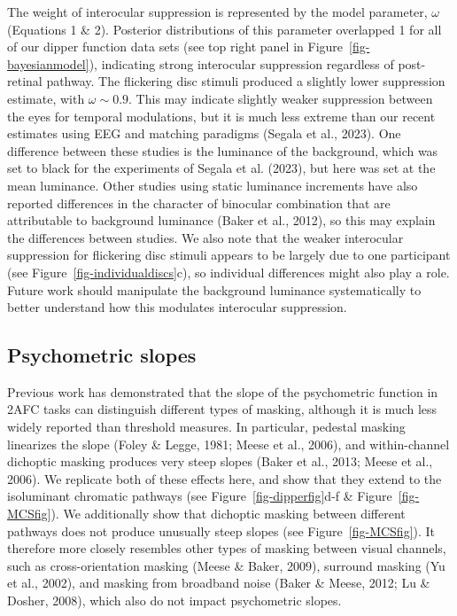 \documentclass[
  letterpaper,
  DIV=11,
  numbers=noendperiod]{scrartcl}
\begin{document}
The weight of interocular suppression is represented by the model
parameter, \(\omega\) (Equations 1 \& 2). Posterior distributions of
this parameter overlapped 1 for all of our dipper function data sets
(see top right panel in Figure~\ref{fig-bayesianmodel}), indicating
strong interocular suppression regardless of post-retinal pathway. The
flickering disc stimuli produced a slightly lower suppression estimate,
with \(\omega \sim 0.9\). This may indicate slightly weaker suppression
between the eyes for temporal modulations, but it is much less extreme
than our recent estimates using EEG and matching paradigms (Segala et
al., 2023). One difference between these studies is the luminance of the
background, which was set to black for the experiments of Segala et al.
(2023), but here was set at the mean luminance. Other studies using
static luminance increments have also reported differences in the
character of binocular combination that are attributable to background
luminance (Baker et al., 2012), so this may explain the differences
between studies. We also note that the weaker interocular suppression
for flickering disc stimuli appears to be largely due to one participant
(see Figure~\ref{fig-individualdiscs}c), so individual differences might
also play a role. Future work should manipulate the background luminance
systematically to better understand how this modulates interocular
suppression.

\hypertarget{psychometric-slopes}{%
\subsection{Psychometric slopes}\label{psychometric-slopes}}

Previous work has demonstrated that the slope of the psychometric
function in 2AFC tasks can distinguish different types of masking,
although it is much less widely reported than threshold measures. In
particular, pedestal masking linearizes the slope (Foley \& Legge, 1981;
Meese et al., 2006), and within-channel dichoptic masking produces very
steep slopes (Baker et al., 2013; Meese et al., 2006). We replicate both
of these effects here, and show that they extend to the isoluminant
chromatic pathways (see Figure~\ref{fig-dipperfig}d-f \&
Figure~\ref{fig-MCSfig}). We additionally show that dichoptic masking
between different pathways does not produce unusually steep slopes (see
Figure~\ref{fig-MCSfig}). It therefore more closely resembles other
types of masking between visual channels, such as cross-orientation
masking (Meese \& Baker, 2009), surround masking (Yu et al., 2002), and
masking from broadband noise (Baker \& Meese, 2012; Lu \& Dosher, 2008),
which also do not impact psychometric slopes.
\end{document}
